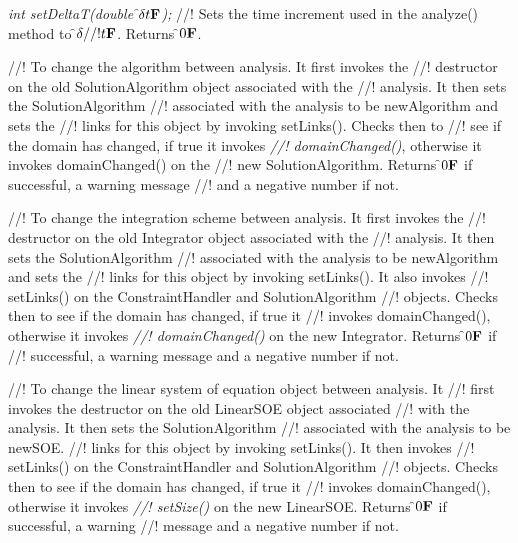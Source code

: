 {\em int setDeltaT(double \f$\delta t{\bf F}$);}
//! Sets the time increment used in the analyze() method to \f$\delta
//! t{\bf F}$. Returns \f$0{\bf F}$.

//! To change the algorithm between analysis. It first invokes the
//! destructor on the old SolutionAlgorithm object associated with the
//! analysis. It then sets the SolutionAlgorithm 
//! associated with the analysis to be \p newAlgorithm and sets the
//! links for this object by invoking setLinks(). Checks then to
//! see if the domain has changed, if true it invokes {\em
//! domainChanged()}, otherwise it invokes domainChanged() on the
//! new SolutionAlgorithm. Returns \f$0{\bf F}$ if successful, a warning message
//! and a negative number if not.

//! To change the integration scheme between analysis. It first invokes the
//! destructor on the old Integrator object associated with the
//! analysis. It then sets the SolutionAlgorithm 
//! associated with the analysis to be \p newAlgorithm and sets the
//! links for this object by invoking setLinks(). It also invokes
//! setLinks() on the ConstraintHandler and SolutionAlgorithm
//! objects. Checks then to see if the domain has changed, if true it
//! invokes domainChanged(), otherwise it invokes {\em
//! domainChanged()} on the new Integrator. Returns \f$0{\bf F}$ if
//! successful, a warning message and a negative number if not.

//! To change the linear system of equation object between analysis. It
//! first invokes the destructor on the old LinearSOE object associated
//! with the analysis. It then sets the SolutionAlgorithm 
//! associated with the analysis to be \p newSOE.
//! links for this object by invoking setLinks(). It then invokes
//! setLinks() on the ConstraintHandler and SolutionAlgorithm
//! objects. Checks then to see if the domain has changed, if true it
//! invokes domainChanged(), otherwise it invokes {\em
//! setSize()} on the new LinearSOE. Returns \f$0{\bf F}$ if successful, a warning
//! message and a negative number if not. 
